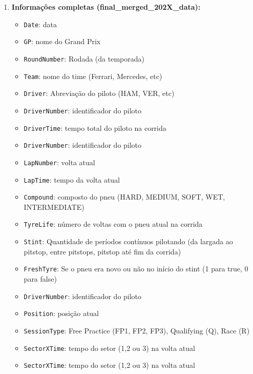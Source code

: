 \documentclass[12pt]{article}
\begin{document}
\begin{enumerate}
    \item \textbf{Informações completas (final\_merged\_202X\_data):}
        \begin{itemize}
            \item \texttt{Date}: data
            \item \texttt{GP}: nome do Grand Prix
            \item \texttt{RoundNumber}: Rodada (da temporada)
            \item \texttt{Team}: nome do time (Ferrari, Mercedes, etc)
            \item \texttt{Driver}: Abreviação do piloto (HAM, VER, etc)
            \item \texttt{DriverNumber}: identificador do piloto
            \item \texttt{DriverTime}: tempo total do piloto na corrida
            \item \texttt{DriverNumber}: identificador do piloto
            \item \texttt{LapNumber}: volta atual
            \item \texttt{LapTime}: tempo da volta atual
            \item \texttt{Compound}: composto do pneu (HARD, MEDIUM, SOFT, WET, INTERMEDIATE)
            \item \texttt{TyreLife}: número de voltas com o pneu atual na corrida
            \item \texttt{Stint}: Quantidade de períodos contínuos pilotando (da largada ao pitstop, entre pitstops, pitstop até fim da corrida)
            \item \texttt{FreshTyre}: Se o pneu era novo ou não no início do stint (1 para true, 0 para false)
            \item \texttt{DriverNumber}: identificador do piloto
            \item \texttt{Position}: posição atual
            \item \texttt{SessionType}: Free Practice (FP1, FP2, FP3), Qualifying (Q), Race (R)
            \item \texttt{SectorXTime}: tempo do setor (1,2 ou 3) na volta atual
            \item \texttt{SectorXTime}: tempo do setor (1,2 ou 3) na volta atual
        \end{itemize}
\end{enumerate}
\end{document}
